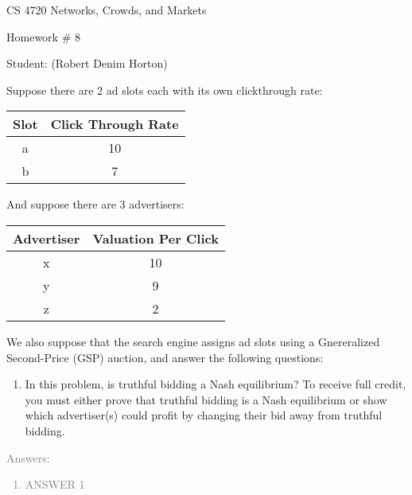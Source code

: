 \documentclass[11pt]{article}
\begin{document}
 

\rhead{\today}

\begin{center}\begin{Large}
CS 4720 Networks, Crowds, and Markets

Homework \#  8

Student: (Robert Denim Horton)
\end{Large}
\end{center}

Suppose there are 2 ad slots each with its own clickthrough rate: 
\begin{center}
	\begin{tabular}{ |c|c|} 
		 \hline
		 Slot & Click Through Rate \\ 
		 \hline\hline
		 a & 10 \\ 
		 \hline
		 b & 7 \\ 
 		\hline
	\end{tabular}
\end{center}
And suppose there are 3 advertisers:
\begin{center}
\begin{tabular}{ |c|c| } 
 \hline
 Advertiser & Valuation Per Click \\ 
 \hline\hline
 x & 10 \\
 \hline 
 y & 9 \\
 \hline
z & 2 \\ 
 \hline
\end{tabular}
\end{center}
We also suppose that the search engine assigns ad slots using a Gnereralized Second-Price (GSP) auction, and answer the following questions:

\begin{enumerate}
	 \item In this problem, is truthful bidding a Nash equilibrium? To receive full credit, you must either prove that truthful bidding is a Nash equilibrium or show which advertiser(s) could profit by changing their bid away from truthful bidding.
\end{enumerate}
\textcolor{gray}{
Answers:
\begin{enumerate}
	\item ANSWER 1 \\
\end{enumerate}
}
\end{document}
